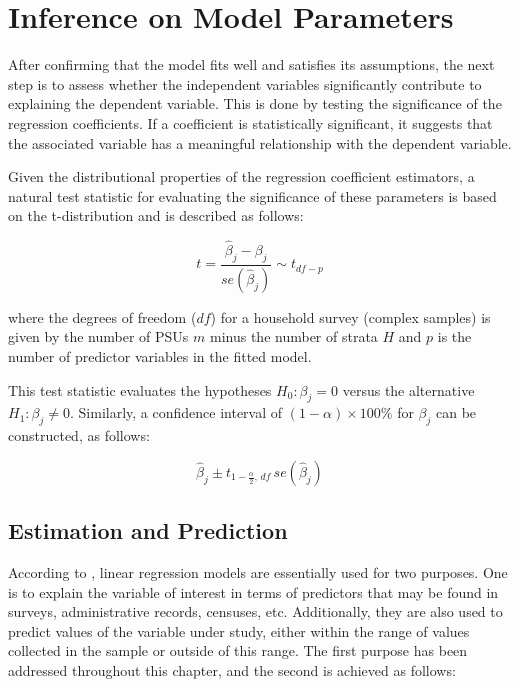 \documentclass[
  12pt,
]{book}
\begin{document}
\hypertarget{inference-on-model-parameters}{%
\section{Inference on Model Parameters}\label{inference-on-model-parameters}}

After confirming that the model fits well and satisfies its assumptions, the next step is to assess whether the independent variables significantly contribute to explaining the dependent variable. This is done by testing the significance of the regression coefficients. If a coefficient is statistically significant, it suggests that the associated variable has a meaningful relationship with the dependent variable.

Given the distributional properties of the regression coefficient estimators, a natural test statistic for evaluating the significance of these parameters is based on the t-distribution and is described as follows:

\[
t = \frac{\widehat{\beta}_{j}-\beta_{j}}{se\left(\widehat{\beta}_{j}\right)}\sim t_{df - p}
\]

where the degrees of freedom (\(df\)) for a household survey (complex samples) is given by the number of PSUs \(m\) minus the number of strata \(H\) and \(p\) is the number of predictor variables in the fitted model.

This test statistic evaluates the hypotheses \(H_{0}:\beta_{j}=0\) versus the alternative \(H_{1}:\beta_{j}\neq0\). Similarly, a confidence interval of \((1-\alpha)\times100\%\) for \(\beta_{j}\) can be constructed, as follows:

\[
\widehat{\beta}_{j}\pm t_{1-\frac{\alpha}{2},\,df}\,se\left(\widehat{\beta}_{j}\right)
\]

\hypertarget{estimation-and-prediction}{%
\subsection{Estimation and Prediction}\label{estimation-and-prediction}}

According to \citet{neter1996applied}, linear regression models are essentially used for two purposes. One is to explain the variable of interest in terms of predictors that may be found in surveys, administrative records, censuses, etc. Additionally, they are also used to predict values of the variable under study, either within the range of values collected in the sample or outside of this range. The first purpose has been addressed throughout this chapter, and the second is achieved as follows:
\end{document}

